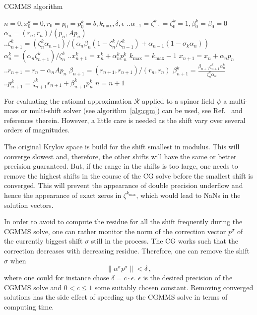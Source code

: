 \begin{algorithm}
  \caption{CGMMS algorithm}
  \label{alg:cgm}
  \begin{algorithmic}[1]
    \vspace{.2cm}
    \STATE $n=0, x_0^k = 0, r_0 = p_0 = p_0^k = b, k_\mathrm{max},
    \delta, \epsilon$
    \STATE  $\biggl.\biggr.\alpha_{-1} = \zeta_{-1}^k = \zeta_0^k = 1, \beta_0^k = \beta_0 = 0$
    \REPEAT
    \STATE $\alpha_n = (r_n, r_n) / (p_n, A p_n)$
    \STATE $\biggl.\biggr.\zeta_{n+1}^k = (\zeta^k_n  \alpha_{n-1}) / 
      (\alpha_n \beta_n(1 - \zeta_n^k / \zeta^k_{n-1}) + \alpha_{n-1}
      (1-\sigma_k\alpha_n))$
    \STATE $\alpha^k_n = (\alpha_n \zeta_{n+1}^k)/ \zeta_n^k$
    \STATE $\biggl.\biggr.x_{n+1}^k = x_n^k + \alpha_n^k p_n^k$
    \STATE $k_\mathrm{max} = k_\mathrm{max} -1$
    \ENDIF
    \ENDFOR
    \STATE $x_{n+1} = x_n + \alpha_n p_n$
    \STATE $\biggl.\biggr.r_{n+1} = r_n - \alpha_n Ap_n$
    \STATE $\beta_{n+1} = (r_{n+1}, r_{n+1}) / (r_n, r_n)$
    \STATE $\beta_{n+1}^k = \frac{\beta_{n+1} \zeta_{n+1}^k \alpha_n^k}{\zeta_{n}^k\alpha_n}$
    \STATE $\biggl.\biggr.p_{n+1}^k = \zeta_{n+1}^k r_{n+1} + \beta_{n+1}^k p_n^k$
    \STATE $n=n+1$
  \end{algorithmic}
\end{algorithm}


For evaluating the rational approximation $\mathcal{R}$ applied to a
spinor field $\psi$ a multi-mass or multi-shift solver (see
algorithm~\ref{alg:cgm}) can be used, see Ref.~\cite{Chiarappa:2006hz}
and references therein. However, a little care is needed
as the shift vary over several orders of magnitudes.

The original Krylov space is build for the shift smallest in
modulus. This will converge slowest and, therefore, the other shifts
will have the same or better precision guaranteed. But, if the
range in the shifts is too large, one needs to remove the highest
shifts in the course of the CG solve before the smallest shift is
converged. This will prevent the appearance of double precision
underflow and hence the appearance of exact zeros in
$\zeta^{k_\mathrm{max}}$, which would lead to 
NaNs in the solution vectors.

In order to avoid to compute the residue for all the shift frequently
during the CGMMS solve, one can rather monitor the norm of the
correction vector $p^\sigma$ of the currently biggest shift $\sigma$
still in the process. The CG works such that the correction decreases
with decreasing residue. Therefore, one can remove the shift $\sigma$
when
\[
\|\alpha^\sigma p^\sigma\| < \delta\,,
\]
where one could for instance chose $\delta =
c\cdot\epsilon$. $\epsilon$ is the desired precision of the CGMMS
solve and $0<c\leq1$ some suitably chosen constant. Removing converged
solutions has the side effect of speeding up the CGMMS solve in terms
of computing time.

